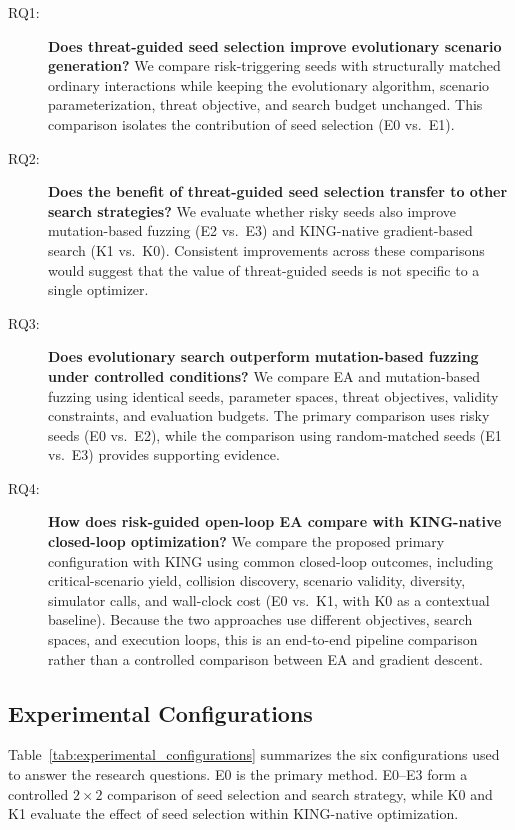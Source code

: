 \begin{description}
    \item[RQ1:] \textbf{Does threat-guided seed selection improve evolutionary scenario generation?}
    We compare risk-triggering seeds with structurally matched ordinary interactions while keeping the evolutionary algorithm, scenario parameterization, threat objective, and search budget unchanged. This comparison isolates the contribution of seed selection (E0 vs.~E1).

    \item[RQ2:] \textbf{Does the benefit of threat-guided seed selection transfer to other search strategies?}
    We evaluate whether risky seeds also improve mutation-based fuzzing (E2 vs.~E3) and KING-native gradient-based search (K1 vs.~K0). Consistent improvements across these comparisons would suggest that the value of threat-guided seeds is not specific to a single optimizer.

    \item[RQ3:] \textbf{Does evolutionary search outperform mutation-based fuzzing under controlled conditions?}
    We compare EA and mutation-based fuzzing using identical seeds, parameter spaces, threat objectives, validity constraints, and evaluation budgets. The primary comparison uses risky seeds (E0 vs.~E2), while the comparison using random-matched seeds (E1 vs.~E3) provides supporting evidence.

    \item[RQ4:] \textbf{How does risk-guided open-loop EA compare with KING-native closed-loop optimization?}
    We compare the proposed primary configuration with KING using common closed-loop outcomes, including critical-scenario yield, collision discovery, scenario validity, diversity, simulator calls, and wall-clock cost (E0 vs.~K1, with K0 as a contextual baseline). Because the two approaches use different objectives, search spaces, and execution loops, this is an end-to-end pipeline comparison rather than a controlled comparison between EA and gradient descent.
\end{description}

\subsection{Experimental Configurations}
\label{sec:experimental_configurations}

Table~\ref{tab:experimental_configurations} summarizes the six configurations used to answer the research questions. E0 is the primary method. E0--E3 form a controlled $2\times2$ comparison of seed selection and search strategy, while K0 and K1 evaluate the effect of seed selection within KING-native optimization.

